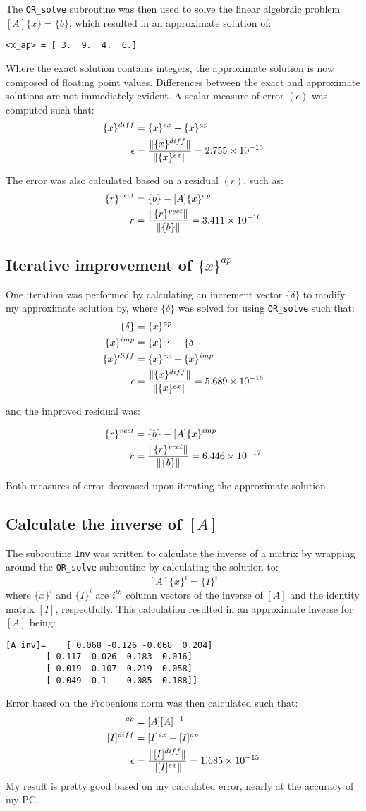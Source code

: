 \documentclass[letterpaper, 10pt, oneside]{article}
\newcommand{\as}[1]{\begin{align*}#1\end{align*}}
\DeclarePairedDelimiter\norm{\lVert}{\rVert}%
\begin{document}
The \verb|QR_solve| subroutine was then used to solve the linear algebraic problem $[A]\{x\}=\{b\}$, which resulted in an approximate solution of:

\begin{lstlisting}
<x_ap> = [ 3.  9.  4.  6.]
\end{lstlisting} 

Where the exact solution contains integers, the approximate solution is now composed of floating point values.  Differences between the exact and approximate solutions are not immediately evident.  A scalar measure of error $(\epsilon)$ was computed such that:
\as{\{x\}^{diff} &= \{x\}^{ex} - \{x\}^{ap} \\
\epsilon&= \frac{\norm{\{x\}^{diff}}}{\norm{\{x\}^{ex}}} = 2.755\times 10^{-15}}

The error was also calculated based on a residual $(r)$, such as:
\as{\{r\}^{vect} &= \{b\} - [A]\{x\}^{ap} \\
r &= \frac{\norm{\{r\}^{vect}}}{\norm{\{b\}}} = 3.411 \times 10^{-16}} 

\subsection{Iterative improvement of $\{x\}^{ap}$}
One iteration was performed by calculating an increment vector $\{\delta\}$ to modify my approximate solution by, where $\{\delta\}$ was solved for using \verb|QR_solve| such that:
\as{[A]\{\delta\} &= \{x\}^{ap} \\
\{x\}^{imp} &=\{x\}^{ap} + \{\delta\ \\
\{x\}^{diff} &= \{x\}^{ex} - \{x\}^{imp} \\
\epsilon&= \frac{\norm{\{x\}^{diff}}}{\norm{\{x\}^{ex}}} = 5.689\times 10^{-16}}

and the improved residual was:

\as{\{r\}^{vect} &= \{b\} - [A]\{x\}^{imp} \\
r &= \frac{\norm{\{r\}^{vect}}}{\norm{\{b\}}} = 6.446 \times 10^{-17}} 

Both measures of error decreased upon iterating the approximate solution.

\subsection{Calculate the inverse of $[A]$}

The subroutine \verb|Inv| was written to calculate the inverse of a matrix by wrapping around the \verb|QR_solve| subroutine by calculating the solution to:
$$[A]\{x\}^i = \{I\}^i$$
where $\{x\}^i \text{ and } \{I\}^i$ are $i^{th}$ column vectors of the inverse of $[A]$ and the identity matrix $[I]$, respectfully. This calculation resulted in an approximate inverse for $[A]$ being:
\begin{lstlisting}
[A_inv]=	[ 0.068 -0.126 -0.068  0.204]
		[-0.117  0.026  0.183 -0.016]
		[ 0.019  0.107 -0.219  0.058]
		[ 0.049  0.1    0.085 -0.188]]
\end{lstlisting}

Error based on the Frobenious norm was then calculated such that:
\as{[I]^{ap} &= [A][A]^{-1} \\
[I]^{diff} &= [I]^{ex} - [I]^{ap} \\
\epsilon&= \frac{\norm{[I]^{diff}}}{\norm{[I]^{ex}}} = 1.685\times 10^{-15}}
My result is pretty good based on my calculated error, nearly at the accuracy of my PC.
\end{document}
